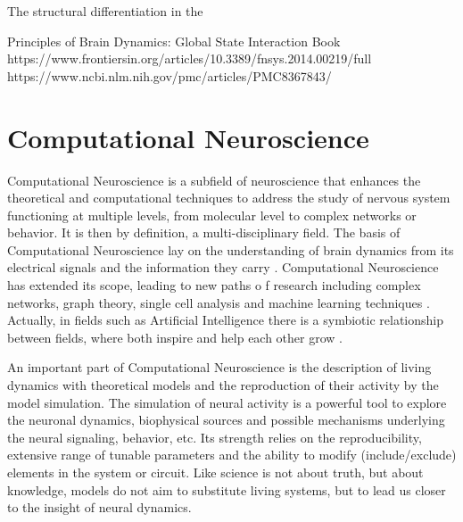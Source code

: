 The structural differentiation in the 




Principles of Brain Dynamics: Global State Interaction Book
https://www.frontiersin.org/articles/10.3389/fnsys.2014.00219/full
https://www.ncbi.nlm.nih.gov/pmc/articles/PMC8367843/







\section{Computational Neuroscience}
Computational Neuroscience is a subfield of neuroscience that enhances the theoretical and computational techniques to address the study of nervous system functioning at multiple levels, from molecular level to complex networks or behavior. It is then by definition, a multi-disciplinary field. The basis of Computational Neuroscience lay on the understanding of brain dynamics from its electrical signals and the information they carry \parencite{schwiening_brief_2012,catterall_hodgkin-huxley_2012,dimitrov_information_2011,shannon_mathematical_1948}. Computational Neuroscience has extended its scope, leading to new paths o	f research including complex networks, graph theory, single cell analysis and machine learning techniques \parencite{cns2023}. Actually, in fields such as Artificial Intelligence there is a symbiotic relationship between fields, where both inspire and help each other grow \parencite{amunts_human_2019,wozniak_deep_2020,goncalves_training_2020}.

An important part of Computational Neuroscience is the description of living dynamics with theoretical models and the reproduction of their activity by the model simulation. The simulation of neural activity is a powerful tool to explore the neuronal dynamics, biophysical sources and possible mechanisms underlying the neural signaling, behavior, etc. Its strength relies on the reproducibility, extensive range of tunable parameters and the ability to modify (include/exclude) elements in the system or circuit. Like science is not about truth, but about knowledge, models do not aim to substitute living systems, but to lead us closer to the insight of neural dynamics. %

